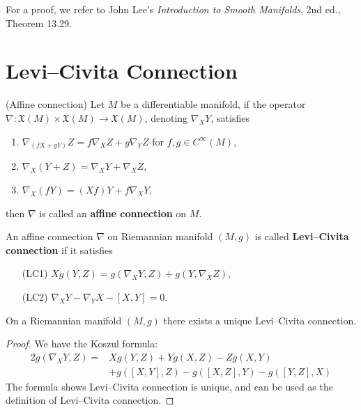 For a proof, we refer to John Lee's \emph{Introduction to Smooth Manifolds}, 2nd ed., Theo\-rem 13.29.

\section{Levi--Civita Connection}

\begin{defn}(Affine connection)
    Let $M$ be a differentiable manifold, if the operator $\nabla:\mathfrak{X}(M)\times\mathfrak{X}(M)\to\mathfrak{X}(M)$, denoting $\nabla_XY$, satisfies
    \begin{enumerate}[(1)]
        \item $\nabla_{(fX+gY)}Z=f\nabla_XZ+g\nabla_YZ$ for $f,g\in C^\infty(M)$,
        \item $\nabla_X(Y+Z)=\nabla_XY+\nabla_XZ$,
        \item $\nabla_X(fY)=(Xf)Y+f\nabla_XY$,
    \end{enumerate}
    then $\nabla$ is called an \textbf{affine connection} on $M$.
\end{defn}

\begin{defn}
    An affine connection $\nabla$ on Riemannian manifold $(M,g)$ is called \textbf{Levi--Civita connection} if it satisfies
    \begin{itemize}
        \item[(LC1)] $Xg(Y,Z)=g(\nabla_XY,Z)+g(Y,\nabla_XZ)$,
        \item[(LC2)] $\nabla_XY-\nabla_YX-[X,Y]=0$.
    \end{itemize}
\end{defn}

\begin{prop}
    On a Riemannian manifold $(M,g)$ there exists a unique Levi--Civita connection.
\end{prop}
\begin{proof}
    We have the Koszul formula:
    \begin{align*}
        2g(\nabla_XY,Z)=&Xg(Y,Z)+Yg(X,Z)-Zg(X,Y)\\
        &+g([X,Y],Z)-g([X,Z],Y)-g([Y,Z],X)
    \end{align*}
    The formula shows Levi--Civita connection is unique, and can be used as the definition of Levi--Civita connection.
\end{proof}

